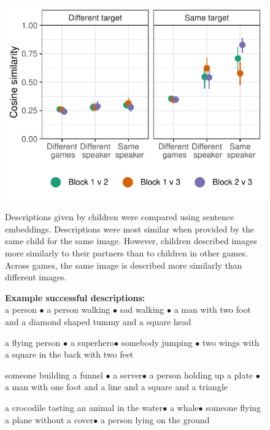 \documentclass[11pt,a4paper]{article}
\begin{document}
\begin{figure}
\begin{minipage}{.5\textwidth}
		\end{minipage}
		~~~
		\begin{minipage}{.5\textwidth}	
		{\includegraphics[width=\textwidth]{sims.pdf}} 
		\begin{small}
		Descriptions given by children were compared using sentence embeddings. Descriptions were most similar when provided by the same child for the same image. However, children described images more similarly to their partners than to children in other games.  Across games, the same image is described more similarly than different images.
		\end{small}
		
		\bigskip
		\begin{small}
\textbf{\centering Example successful descriptions:\\}
\smallskip
		a person $\bullet$ a person walking $\bullet$ sad walking $\bullet$ a man with two foot and a diamond shaped tummy and a square head
		
		\smallskip
		a flying person $\bullet$
		a superhero$\bullet$
		somebody jumping $\bullet$ two wings with a square in the back with two feet
		\smallskip
		
		someone building a funnel $\bullet$
		a server$\bullet$
		a person holding up a plate $\bullet$ a man with one foot and a line and a square and a triangle
		\smallskip
		
		a crocodile tasting an animal in the water$\bullet$
		a whale$\bullet$
		someone flying a plane without a cover$\bullet$
		a person lying on the ground
		
		\end{small}
		\end{minipage}
	\end{figure}
\end{document}
